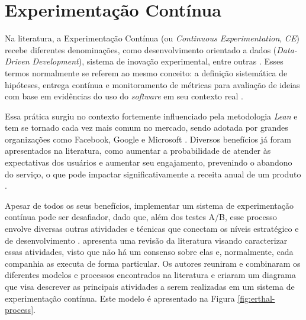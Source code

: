 \section{Experimentação Contínua}
\label{sec:ref-experimentacao-continua}

Na literatura, a Experimentação Contínua (ou \textit{Continuous Experimentation}, \textit{CE}) recebe diferentes denominações, como desenvolvimento orientado a dados (\textit{Data-Driven Development}), sistema de inovação experimental, entre outras \cite{erthal_characterization_2023}. Esses termos normalmente se referem ao mesmo conceito: a definição sistemática de hipóteses, entrega contínua e monitoramento de métricas para avaliação de ideias com base em evidências do uso do \textit{software} em seu contexto real \cite{fagerholm_right_2017}.

Essa prática surgiu no contexto fortemente influenciado pela metodologia \textit{Lean} e tem se tornado cada vez mais comum no mercado, sendo adotada por grandes organizações como Facebook, Google e Microsoft \cite{issa_mattos_hurrier_2023}. Diversos benefícios já foram apresentados na literatura, como aumentar a probabilidade de atender às expectativas dos usuários e aumentar seu engajamento, prevenindo o abandono do serviço, o que pode impactar significativamente a receita anual de um produto \cite{erthal_characterization_2023}.

Apesar de todos os seus benefícios, implementar um sistema de experimentação contínua pode ser desafiador, dado que, além dos testes A/B, esse processo envolve diversas outras atividades e técnicas que conectam os níveis estratégico e de desenvolvimento \cite{issa_mattos_hurrier_2023}.  apresenta uma revisão da literatura visando caracterizar essas atividades, visto que não há um consenso sobre elas e, normalmente, cada companhia as executa de forma particular. Os autores reuniram e combinaram os diferentes modelos e processos encontrados na literatura e criaram um diagrama que visa descrever as principais atividades a serem realizadas em um sistema de experimentação contínua. Este modelo é apresentado na Figura \ref{fig:erthal-process}.

